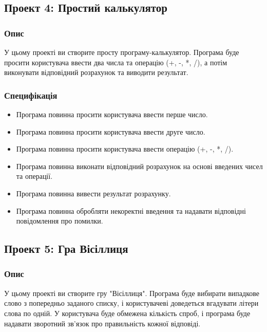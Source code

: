 \documentclass[12pt]{article}
\begin{document}
\newpage

\subsection{Проект 4: Простий калькулятор}

\subsubsection{Опис}
У цьому проекті ви створите просту програму-калькулятор. Програма буде просити користувача ввести два числа та операцію (+, -, *, /), а потім виконувати відповідний розрахунок та виводити результат.

\subsubsection{Специфікація}
\begin{itemize}
\item Програма повинна просити користувача ввести перше число.
\item Програма повинна просити користувача ввести друге число.
\item Програма повинна просити користувача ввести операцію (+, -, *, /).
\item Програма повинна виконати відповідний розрахунок на основі введених чисел та операції.
\item Програма повинна вивести результат розрахунку.
\item Програма повинна обробляти некоректні введення та надавати відповідні повідомлення про помилки.
\end{itemize}

\newpage

\subsection{Проект 5: Гра Вісіллиця}

\subsubsection{Опис}
У цьому проекті ви створите гру "Вісіллиця". Програма буде вибирати випадкове слово з попередньо заданого списку, і користувачеві доведеться вгадувати літери слова по одній. У користувача буде обмежена кількість спроб, і програма буде надавати зворотний зв'язок про правильність кожної відповіді.
\end{document}

